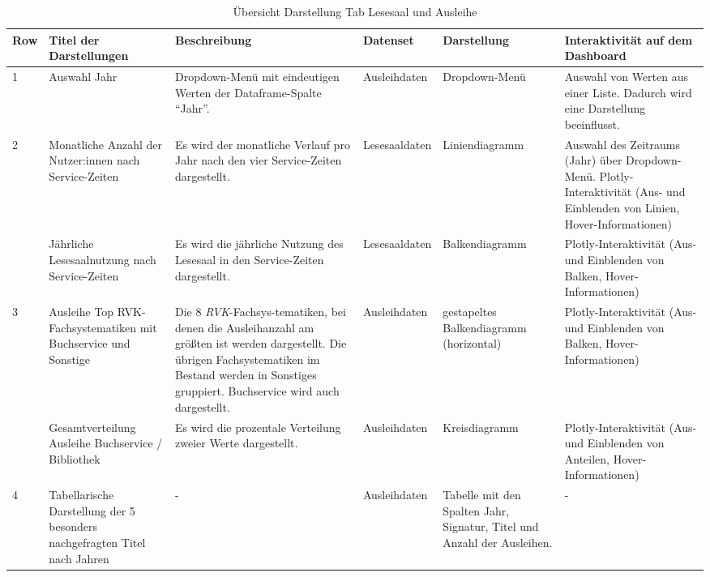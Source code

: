 \clearpage
{}
\recalctypearea  

    \begingroup
    \setlength{\tabcolsep}{12pt} %
    \renewcommand{\arraystretch}{1.5} 
    \begin{table}[h]
        \LARGE
        \centering
        \begin{adjustbox}{max width=\textwidth}
        \begin{tabular}{p{}p{}p{}p{}p{}p{}}
           \toprule
           Row        &Titel der Darstellungen&Beschreibung &Datenset &Darstellung &Interaktivität auf dem Dashboard\\
           \midrule
            1           &Auswahl  Jahr &Dropdown-Menü mit eindeutigen Werten der Dataframe-Spalte \enquote{Jahr}.&Ausleihdaten&Dropdown-Menü &Auswahl von Werten aus einer Liste. Dadurch wird eine Darstellung beeinflusst.\\
           \midrule
            2           &Monatliche Anzahl der Nutzer:innen nach Service-Zeiten&Es wird der monatliche Verlauf pro Jahr nach den vier Service-Zeiten dargestellt.&Lesesaaldaten&Liniendiagramm&Auswahl des Zeitraums (Jahr) über Dropdown-Menü. Plotly-Interaktivität (Aus- und Einblenden von Linien, Hover-Informationen)\\
                        &Jährliche Lesesaalnutzung nach Service-Zeiten&Es wird die jährliche Nutzung des Lesesaal in den Service-Zeiten dargestellt.&Lesesaaldaten&Balkendiagramm    &Plotly-Interaktivität (Aus- und Einblenden von Balken, Hover-Informationen)\\          
            \midrule
            3           &Ausleihe Top RVK-Fachsystematiken mit Buchservice und Sonstige&Die 8 \textit{\acrshort{RVK}}-Fachsys-tematiken, bei denen die Ausleihanzahl am größten ist werden dargestellt. Die übrigen Fachsystematiken im Bestand werden in Sonstiges gruppiert. Buchservice wird auch dargestellt.&Ausleihdaten&gestapeltes Balkendiagramm (horizontal)&Plotly-Interaktivität (Aus- und Einblenden von Balken, Hover-Informationen)\\
                        &Gesamtverteilung Ausleihe Buchservice / Bibliothek&Es wird die prozentale Verteilung zweier Werte dargestellt.&Ausleihdaten    &Kreisdiagramm   &Plotly-Interaktivität (Aus- und Einblenden von Anteilen, Hover-Informationen)\\
            \midrule
            4           &Tabellarische Darstellung der 5 besonders nachgefragten Titel nach Jahren&-&Ausleihdaten    &Tabelle mit den Spalten Jahr, Signatur, Titel und Anzahl der Ausleihen.&-\\

        \bottomrule
        \end{tabular}
        \end{adjustbox}
        \caption{%
            Übersicht Darstellung Tab Lesesaal und Ausleihe
        }
        \label{tab:Darstellung Tab Lesesaal und Ausleihe}
        \end{table}
    \endgroup

